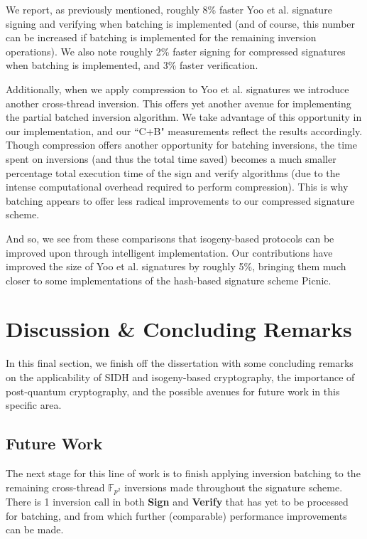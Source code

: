 We report, as previously mentioned, roughly 8\% faster Yoo et al. signature signing and verifying when batching is implemented (and of course, this number can be increased if batching is implemented for the remaining inversion operations). We also note roughly 2\% faster signing for compressed signatures when batching is implemented, and 3\% faster verification.

Additionally, when we apply compression to Yoo et al. signatures we introduce another cross-thread inversion. This offers yet another avenue for implementing the partial batched inversion algorithm. We take advantage of this opportunity in our implementation, and our ``C+B" measurements reflect the results accordingly. Though compression offers another opportunity for batching inversions, the time spent on inversions (and thus the total time saved) becomes a much smaller percentage total execution time of the sign and verify algorithms (due to the intense computational overhead required to perform compression). This is why batching appears to offer less radical improvements to our compressed signature scheme.

\vspace{15px}

And so, we see from these comparisons that isogeny-based protocols can be improved upon through intelligent implementation. Our contributions have improved the size of Yoo et al. signatures by roughly 5\%, bringing them much closer to some implementations of the hash-based signature scheme Picnic.


\section{Discussion \& Concluding Remarks}

In this final section, we finish off the dissertation with some concluding remarks on the applicability of SIDH and isogeny-based cryptography, the importance of post-quantum cryptography, and the possible avenues for future work in this specific area.

\subsection{Future Work}
\label{sec:morebatch}

The next stage for this line of work is to finish applying inversion batching to the remaining cross-thread $\mathbb{F}_{p^2}$ inversions made throughout the signature scheme. There is 1 inversion call in both \textbf{Sign} and \textbf{Verify} that has yet to be processed for batching, and from which further (comparable) performance improvements can be made.

